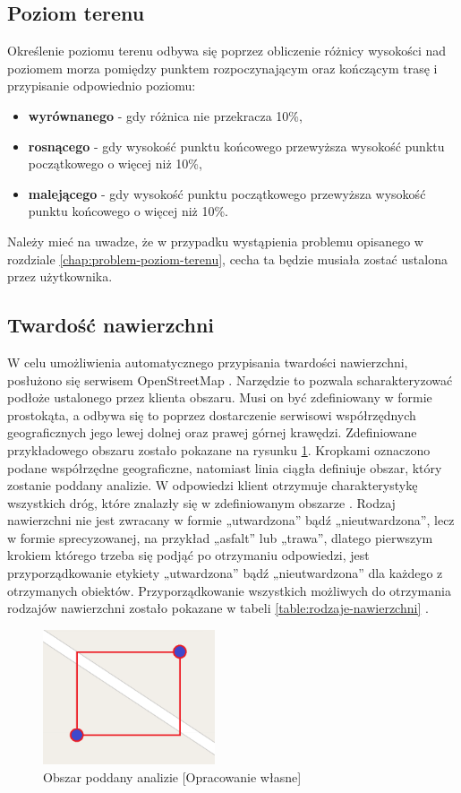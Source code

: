 \subsection{Poziom terenu}
Określenie poziomu terenu odbywa się poprzez obliczenie różnicy wysokości nad poziomem morza pomiędzy punktem rozpoczynającym oraz kończącym trasę i przypisanie odpowiednio poziomu:
\begin{itemize}
\item{\textbf{wyrównanego}} - gdy różnica nie przekracza 10\%,
\item{\textbf{rosnącego}} - gdy wysokość punktu końcowego przewyższa wysokość punktu początkowego o więcej niż 10\%,
\item{\textbf{malejącego}} - gdy wysokość punktu początkowego przewyższa wysokość punktu końcowego o więcej niż 10\%.
\end {itemize}
Należy mieć na uwadze, że w przypadku wystąpienia problemu opisanego w rozdziale \ref{chap:problem-poziom-terenu}, cecha ta będzie musiała zostać ustalona przez użytkownika.

\subsection{Twardość nawierzchni}\label{chapter:wyznaczenie-twardosc}
W celu umożliwienia automatycznego przypisania twardości nawierzchni, posłużono się serwisem OpenStreetMap \cite{osm}. Narzędzie to pozwala scharakteryzować podłoże ustalonego przez klienta obszaru. Musi on być zdefiniowany w formie prostokąta, a odbywa się to poprzez dostarczenie serwisowi współrzędnych geograficznych jego lewej dolnej oraz prawej górnej krawędzi. Zdefiniowane przykładowego obszaru zostało pokazane na rysunku \ref{image:mapka_obszar}. Kropkami oznaczono podane współrzędne geograficzne, natomiast linia ciągła definiuje obszar, który zostanie poddany analizie. W odpowiedzi klient otrzymuje charakterystykę wszystkich dróg, które znalazły się w zdefiniowanym obszarze \cite{osm-docs-wiki}. Rodzaj nawierzchni nie jest zwracany w formie „utwardzona” bądź „nieutwardzona”, lecz w formie sprecyzowanej, na przykład „asfalt” lub „trawa”, dlatego pierwszym krokiem którego trzeba się podjąć po otrzymaniu odpowiedzi, jest przyporządkowanie etykiety  „utwardzona” bądź „nieutwardzona” dla każdego z otrzymanych obiektów. Przyporządkowanie wszystkich możliwych do otrzymania rodzajów nawierzchni zostało pokazane w tabeli \ref{table:rodzaje-nawierzchni} \cite{osm-surface}.

\begin{figure}[h]\label{fig:miary}
\begin{center}
\includegraphics[width=2in]{img/mapka_obszar.png}
\caption{Obszar poddany analizie [Opracowanie własne]}\label{image:mapka_obszar}
\end{center}
\end{figure}

